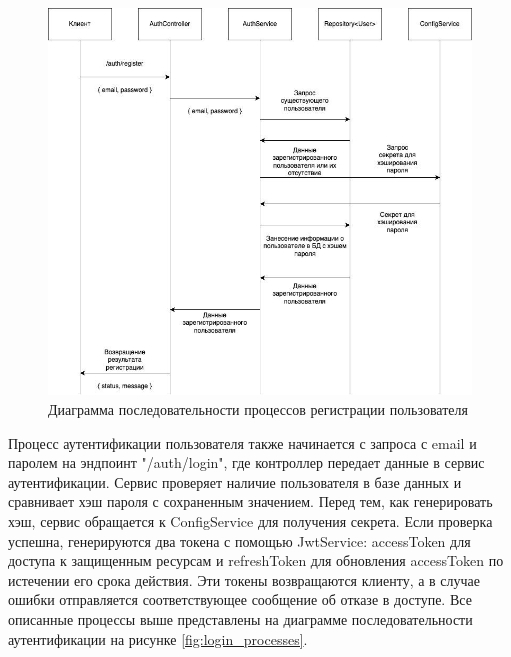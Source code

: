 	\begin{figure}[ht!] 
		\center
		\includegraphics [scale=0.37] {my_folder/images//register_processes}
		\caption{Диаграмма последовательности процессов регистрации пользователя} 
		\label{fig:register_processes}  
	\end{figure}

	Процесс аутентификации пользователя также начинается с запроса с email и паролем на эндпоинт "/auth/login", где контроллер передает данные в сервис аутентификации. Сервис проверяет наличие пользователя в базе данных и сравнивает хэш пароля с сохраненным значением. Перед тем, как генерировать хэш, сервис обращается к ConfigService для получения секрета. Если проверка успешна, генерируются два токена с помощью JwtService: accessToken для доступа к защищенным ресурсам и refreshToken для обновления accessToken по истечении его срока действия. Эти токены возвращаются клиенту, а в случае ошибки отправляется соответствующее сообщение об отказе в доступе. Все описанные процессы выше представлены на диаграмме последовательности аутентификации на рисунке \ref{fig:login_processes}.

